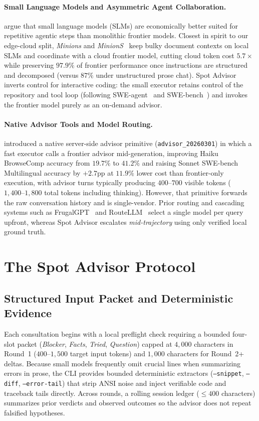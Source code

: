 \documentclass[11pt]{article}
\begin{document}
\paragraph{Small Language Models and Asymmetric Agent Collaboration.}
\citet{belcak2025slm} argue that small language models (SLMs) are economically better suited for repetitive agentic steps than monolithic frontier models. Closest in spirit to our edge-cloud split, \emph{Minions} and \emph{MinionS}~\citep{narayan2025minions} keep bulky document contexts on local SLMs and coordinate with a cloud frontier model, cutting cloud token cost $5.7\times$ while preserving $97.9\%$ of frontier performance once instructions are structured and decomposed (versus $87\%$ under unstructured prose chat). Spot Advisor inverts control for interactive coding: the small executor retains control of the repository and tool loop (following SWE-agent~\citep{yang2024sweagent} and SWE-bench~\citep{jimenez2024swebench}) and invokes the frontier model purely as an on-demand advisor.

\paragraph{Native Advisor Tools and Model Routing.}
\citet{anthropic2026advisor} introduced a native server-side advisor primitive (\texttt{advisor\_20260301}) in which a fast executor calls a frontier advisor mid-generation, improving Haiku BrowseComp accuracy from $19.7\%$ to $41.2\%$ and raising Sonnet SWE-bench Multilingual accuracy by $+2.7\text{pp}$ at $11.9\%$ lower cost than frontier-only execution, with advisor turns typically producing $400\text{--}700$ visible tokens ($1{,}400\text{--}1{,}800$ total tokens including thinking). However, that primitive forwards the raw conversation history and is single-vendor. Prior routing and cascading systems such as FrugalGPT~\citep{chen2023frugalgpt} and RouteLLM~\citep{ong2024routellm} select a single model per query upfront, whereas Spot Advisor escalates \emph{mid-trajectory} using only verified local ground truth.

\section{The Spot Advisor Protocol}
\label{sec:protocol}

\subsection{Structured Input Packet and Deterministic Evidence}
Each consultation begins with a local preflight check requiring a bounded four-slot packet (\emph{Blocker}, \emph{Facts}, \emph{Tried}, \emph{Question}) capped at $4{,}000$ characters in Round~1 ($400\text{--}1{,}500$ target input tokens) and $1{,}000$ characters for Round~2+ deltas. Because small models frequently omit crucial lines when summarizing errors in prose, the CLI provides bounded deterministic extractors (\texttt{--snippet}, \texttt{--diff}, \texttt{--error-tail}) that strip ANSI noise and inject verifiable code and traceback tails directly. Across rounds, a rolling session ledger ($\le 400$ characters) summarizes prior verdicts and observed outcomes so the advisor does not repeat falsified hypotheses.
\end{document}
